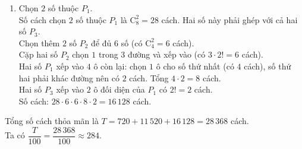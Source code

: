 \begin{ex}
{\begin{enumerate}[\it TH 1:]
\begin{itemize}
				Số cách: $8 \cdot 2 \cdot 3 \cdot 2! \cdot 4! = 2\,304$ cách.
				\item \textit{Loại $1$ số thuộc $P_2$ (có $4$ cách):} $6$ số được xếp gồm $1$ số $P_1$, $2$ số $P_3$ và $3$ số $P_2$.\\
				Số $P_1$ xếp vào $1$ trong $6$ ô (có $6$ cách). Ô đối diện phải là $1$ số $P_3$ (có $2$ cách chọn $P_3$). $4$ số còn lại xếp vào $4$ ô có $4!$ cách.\\
				Số cách: $8 \cdot 4 \cdot 6 \cdot 2 \cdot 4! = 9\,216$ cách.
			\end{itemize}
			Tổng cộng TH 2 có $2\,304 + 9\,216 = 11\,520$ cách.
			\item Chọn $2$ số thuộc $P_1$.\\
			Số cách chọn $2$ số thuộc $P_1$ là $\mathrm{C}_8^2 = 28$ cách. Hai số này phải ghép với cả hai số $P_3$.\\
			Chọn thêm $2$ số $P_2$ để đủ $6$ số (có $\mathrm{C}_4^2 = 6$ cách).\\
			Cặp hai số $P_2$ chọn $1$ trong $3$ đường và xếp vào (có $3 \cdot 2! = 6$ cách).\\
			Hai số $P_1$ xếp vào $4$ ô còn lại: chọn $1$ ô cho số thứ nhất (có $4$ cách), số thứ hai phải khác đường nên có $2$ cách. Tổng $4 \cdot 2 = 8$ cách.\\
			Hai số $P_3$ xếp vào $2$ ô đối diện của $P_1$ có $2! = 2$ cách.\\
			Số cách: $28 \cdot 6 \cdot 6 \cdot 8 \cdot 2 = 16\,128$ cách.
		\end{enumerate}
		Tổng số cách thỏa mãn là $T = 720 + 11\,520 + 16\,128 = 28\,368$ cách.\\
		Ta có $\dfrac{T}{100} = \dfrac{28\,368}{100} \approx 284$.
	}
\end{ex}

